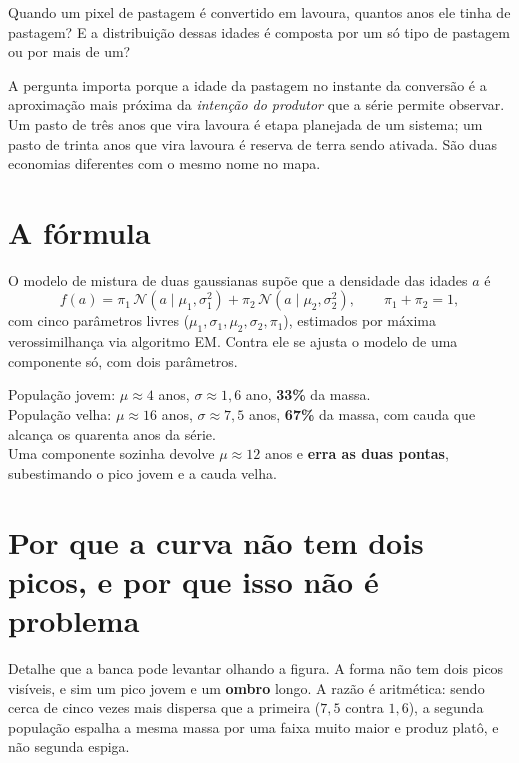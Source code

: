 Quando um pixel de pastagem é convertido em lavoura, quantos anos ele tinha de
pastagem? E a distribuição dessas idades é composta por um só tipo de pastagem
ou por mais de um?

A pergunta importa porque a idade da pastagem no instante da conversão é a
aproximação mais próxima da \emph{intenção do produtor} que a série permite
observar. Um pasto de três anos que vira lavoura é etapa planejada de um
sistema; um pasto de trinta anos que vira lavoura é reserva de terra sendo
ativada. São duas economias diferentes com o mesmo nome no mapa.

\section{A fórmula}

O modelo de mistura de duas gaussianas supõe que a densidade das idades $a$ é
\begin{equation}
f(a) = \pi_1 \, \mathcal{N}(a \mid \mu_1, \sigma_1^2)
     + \pi_2 \, \mathcal{N}(a \mid \mu_2, \sigma_2^2),
\qquad \pi_1 + \pi_2 = 1,
\end{equation}
com cinco parâmetros livres ($\mu_1, \sigma_1, \mu_2, \sigma_2, \pi_1$),
estimados por máxima verossimilhança via algoritmo EM. Contra ele se ajusta o
modelo de uma componente só, com dois parâmetros.

\begin{ancora}[O resultado]
População jovem: $\mu \approx 4$ anos, $\sigma \approx 1{,}6$ ano,
\textbf{33\%} da massa. \\
População velha: $\mu \approx 16$ anos, $\sigma \approx 7{,}5$ anos,
\textbf{67\%} da massa, com cauda que alcança os quarenta anos da série. \\
Uma componente sozinha devolve $\mu \approx 12$ anos e \textbf{erra as duas
pontas}, subestimando o pico jovem e a cauda velha.
\end{ancora}

\section{Por que a curva não tem dois picos, e por que isso não é problema}

Detalhe que a banca pode levantar olhando a figura. A forma não tem dois picos
visíveis, e sim um pico jovem e um \textbf{ombro} longo. A razão é aritmética:
sendo cerca de cinco vezes mais dispersa que a primeira ($7{,}5$ contra
$1{,}6$), a segunda população espalha a mesma massa por uma faixa muito maior e
produz platô, e não segunda espiga.


